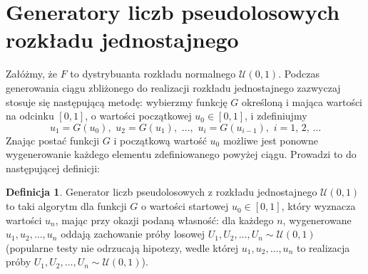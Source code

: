 \documentclass[inzynierska]{pwr_wmat_praca_dyplomowa}
\theoremstyle{plain}
\numberwithin{theorem}{chapter}
\theoremstyle{definition}
\numberwithin{theorem}{chapter}
\newtheorem{definition}[theorem]{Definicja}
\begin{document}
\section{Generatory liczb pseudolosowych rozkładu jednostajnego} %
Załóżmy, że $F$ to dystrybuanta rozkładu normalnego $\mathcal{U}(0,1)$. \cite{koronacki}  Podczas generowania ciągu zbliżonego do realizacji rozkładu jednostajnego zazwyczaj stosuje się następującą metodę: wybierzmy funkcję $G$ określoną i mająca wartości na odcinku $[0,1]$, o wartości początkowej $u_0 \in [0,1]$, i zdefiniujmy
\begin{equation}
	u_1=G(u_0), \,\, u_2=G(u_1), \,\, \dots, \,\,u_i=G(u_{i-1}), \,\, i=1,\,2,\,\dots 
\end{equation}
Znając postać funkcji $G$ i początkową wartość $u_0$ możliwe jest ponowne wygenerowanie każdego elementu zdefiniowanego powyżej ciągu. Prowadzi to do następującej definicji:
\begin{definition}
	Generator liczb pseudolosowych z rozkładu jednostajnego $\mathcal{U}(0,1)$ to taki algorytm dla funkcji $G$ o wartości startowej $u_0 \in [0,1]$, który wyznacza wartości $u_n$, mając przy okazji podaną własność: dla każdego $n$, wygenerowane $u_1,u_2,\dots,u_n$ oddają zachowanie próby losowej $U_1,U_2,\dots,U_n \sim \mathcal{U}(0,1)$ (popularne testy nie odrzucają hipotezy, wedle której $u_1,u_2,\dots,u_n$ to realizacja próby $U_1,U_2,\dots,U_n \sim \mathcal{U}(0,1)$).
\end{definition}
\end{document}

